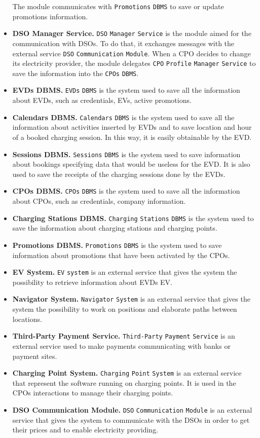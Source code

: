 \begin{itemize}
    The module communicates with \verb|Promotions| \verb|DBMS| to save or update promotions information.
    \item \textbf{DSO Manager Service.} \verb|DSO| \verb|Manager| \verb|Service| is the module aimed for the communication with DSOs.
    To do that, it exchanges messages with the external service \verb|DSO| \verb|Communication| \verb|Module|.
    When a CPO decides to change its electricity provider, the module delegates \verb|CPO| \verb|Profile| \verb|Manager| \verb|Service| to
    save the information into the \verb|CPOs| \verb|DBMS|.
    \item \textbf{EVDs DBMS.} \verb|EVDs| \verb|DBMS| is the system used to save all the information about EVDs, such as
    credentials, EVs, active promotions.
    \item \textbf{Calendars DBMS.} \verb|Calendars| \verb|DBMS| is the system used to save all the information about activities
    inserted by EVDs and to save location and hour of a booked charging session.
    In this way, it is easily obtainable by the EVD\@.
    \item \textbf{Sessions DBMS.} \verb|Sessions| \verb|DBMS| is the system used to save information about bookings
    specifying data that would be useless for the EVD\@.
    It is also used to save the receipts of the charging sessions done by the EVDs.
    \item \textbf{CPOs DBMS.} \verb|CPOs| \verb|DBMS| is the system used to save all the information about CPOs, such as credentials,
    company information.
    \item \textbf{Charging Stations DBMS.} \verb|Charging| \verb|Stations| \verb|DBMS| is the system used to save the information about
    charging stations and charging points.
    \item \textbf{Promotions DBMS.} \verb|Promotions| \verb|DBMS| is the system used to save information about promotions
    that have been activated by the CPOs.
    \item \textbf{EV System.} \verb|EV| \verb|system| is an external service that gives the system the possibility to retrieve
    information about EVDs EV\@.
    \item \textbf{Navigator System.} \verb|Navigator| \verb|System| is an external service that gives the system the possibility
    to work on positions and elaborate paths between locations.
    \item \textbf{Third-Party Payment Service.} \verb|Third-Party| \verb|Payment| \verb|Service| is an external service used to
    make payments communicating with banks or payment sites.
    \item \textbf{Charging Point System.} \verb|Charging| \verb|Point| \verb|System| is an external service that represent the software
    running on charging points.
    It is used in the CPOs interactions to manage their charging points.
    \item \textbf{DSO Communication Module.} \verb|DSO| \verb|Communication| \verb|Module| is an external service that gives the system
    to communicate with the DSOs in order to get their prices and to enable electricity providing.
\end{itemize}


